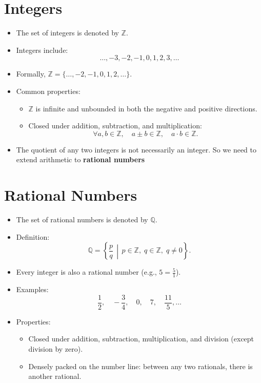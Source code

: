 \section{Integers}
\begin{itemize}
    \item The set of integers is denoted by \(\mathbb{Z}\).
    \item Integers include:
    \[
        \ldots, -3, -2, -1, 0, 1, 2, 3, \ldots
    \]
    \item Formally, \(\mathbb{Z} = \{\dots, -2, -1, 0, 1, 2, \dots\}\). 
    \item Common properties:
    \begin{itemize}
        \item \(\mathbb{Z}\) is infinite and unbounded in both the negative and positive directions.
        \item Closed under addition, subtraction, and multiplication:
        \[
            \forall a, b \in \mathbb{Z}, \quad
            a \pm b \in \mathbb{Z}, \quad
            a \cdot b \in \mathbb{Z}.
        \]
    \end{itemize}
    \item The quotient of any two integers is not necessarily an integer. So we need to extend arithmetic to \textbf{rational numbers}
\end{itemize}

\section{Rational Numbers}
\begin{itemize}
    \item The set of rational numbers is denoted by \(\mathbb{Q}\).
    \item Definition:
    \[
        \mathbb{Q} = \left\{ \frac{p}{q} \,\middle|\,
        p \in \mathbb{Z}, \; q \in \mathbb{Z}, \; q \neq 0
        \right\}.
    \]
    \item Every integer is also a rational number (e.g., \(5 = \frac{5}{1}\)).
    \item Examples:
    \[
        \frac{1}{2}, \quad -\frac{3}{4}, \quad 0, \quad 7, \quad \frac{11}{5}, \ldots
    \]
    \item Properties:
    \begin{itemize}
        \item Closed under addition, subtraction, multiplication, and division (except division by zero).
        \item Densely packed on the number line: between any two rationals, there is another rational.
    \end{itemize}
\end{itemize}

